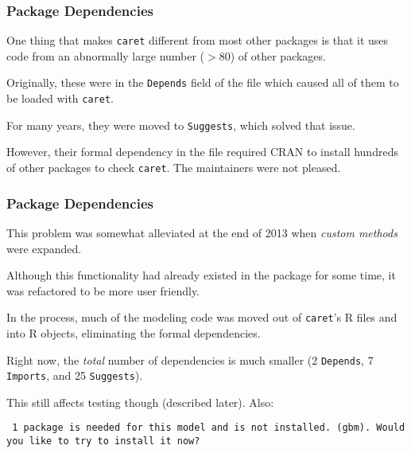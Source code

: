 \documentclass[12 pt]{beamer}\usepackage[]{graphicx}\usepackage[]{color}
\newcommand{\pkg}[1]{{\fontseries{b}\selectfont #1}}
\renewcommand{\pkg}[1]{{\color{darkgreen}\texttt{#1}}}
\begin{document}
  \begin{frame}[fragile]
\frametitle{Package Dependencies}



One thing that makes \pkg{caret} different from most other packages is that it uses code from an abnormally large number ($> 80$) of other packages.

\vspace{.15in}

Originally, these were in the \texttt{Depends} field of the  file which caused all of them to be loaded with \pkg{caret}.

\vspace{.15in}

For many years, they were moved to \texttt{Suggests}, which solved that issue.


\vspace{.15in}

However, their formal dependency in the  file required CRAN  to install hundreds of other packages to check  \pkg{caret}. The maintainers were not pleased.

\end{frame}



\begin{frame}[fragile]
\frametitle{Package Dependencies}

This problem was somewhat alleviated at the end of 2013 when {\em custom methods} were expanded.

\vspace{.1in}

Although this functionality had already existed in the package for some time, it was refactored to be more user friendly.

\vspace{.1in}

In the process, much of the modeling code was moved out of \pkg{caret}'s R files and into R objects, eliminating the formal dependencies.

\vspace{.1in}

Right now, the {\em total} number of dependencies is much smaller (2 \texttt{Depends}, 7 \texttt{Imports}, and 25 \texttt{Suggests}).

\vspace{.1in}

This still affects testing though (described later). Also:

\vspace{.1in}

{\tt \color{darkblue} \footnotesize 1 package is needed for this model and is not installed. (gbm). Would you like to try to install it now?}

\end{frame}
\end{document}
